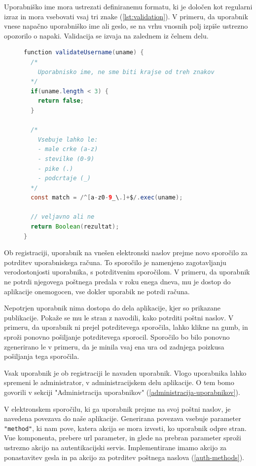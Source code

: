 \documentclass[a4paper, 12pt]{book}
\begin{document}
Uporabniško ime mora ustrezati definiranemu formatu, ki je določen kot regularni izraz in mora vsebovati vsaj tri znake (\ref{lst:validation}). V primeru, da uporabnik vnese napačno uporabniško ime ali geslo, se na vrhu vnosnih polj izpiše ustrezno opozorilo o napaki. Validacija se izvaja na zalednem iz čelnem delu.

\begin{figure}[ht]
\begin{center}
\begin{lstlisting}[language=java, style=mystyle,caption={Primer validacijske funkcije za preverjanje uporabniškega imena z uporabo regularnega izraza},label=lst:validation]
function validateUsername(uname) {
  /*
    Uporabnisko ime, ne sme biti krajse od treh znakov
  */
  if(uname.length < 3) {
    return false;
  }

  /* 
    Vsebuje lahko le: 
    - male crke (a-z) 
    - stevilke (0-9)
    - pike (.)
    - podcrtaje (_)
  */
  const match = /^[a-z0-9_\.]+$/.exec(uname);
  
  // veljavno ali ne
  return Boolean(rezultat);
}
\end{lstlisting}
\end{center}
\end{figure}

Ob registraciji, uporabnik na vnešen elektronski naslov prejme novo sporočilo za potrditev uporabniskega računa. To sporočilo je namenjeno zagotavljanju verodostonjosti uporabnika, s potrditvenim sporočilom. V primeru, da uporabnik ne potrdi njegovega poštnega predala v roku enega dneva, mu je dostop do aplikacije onemogocen, vse dokler uporabik ne potrdi računa.

Nepotrjen uporabnik nima dostopa do dela aplikacije, kjer so prikazane publikacije. Pokaže se mu le stran z navodili, kako potrditi poštni naslov. V primeru, da uporabnik ni prejel potrditevega sporočila, lahko klikne na gumb, in sproži ponovno pošiljanje potrditevega sporocil. Sporočilo bo bilo ponovno zgenerirano le v primeru, da je minila vsaj ena ura od zadnjega poizkusa pošiljanja tega sporočila.

Vsak uporabnik je ob registraciji le navaden uporabnik. Vlogo uporabnika lahko spremeni le administrator, v administracijskem delu aplikacije. O tem bomo govorili v sekciji "Administracija uporabnikov" (\ref{administracija-uporabnikov}).

V elektronskem sporočilu, ki ga uporabnik prejme na svoj poštni naslov, je navedena povezava do naše aplikacije. Generirana povezava vsebuje parameter \verb="method"=, ki nam pove, katera akcija se mora izvesti, ko uporabnik odpre stran. Vue komponenta, prebere url parameter, in glede na prebran parameter sproži ustrezno akcijo na autentikacijski servis. Implementirane imamo akcijo za ponastavitev gesla in pa akcijo za potrditev poštnega naslova (\ref{auth-methods}).
\end{document}
